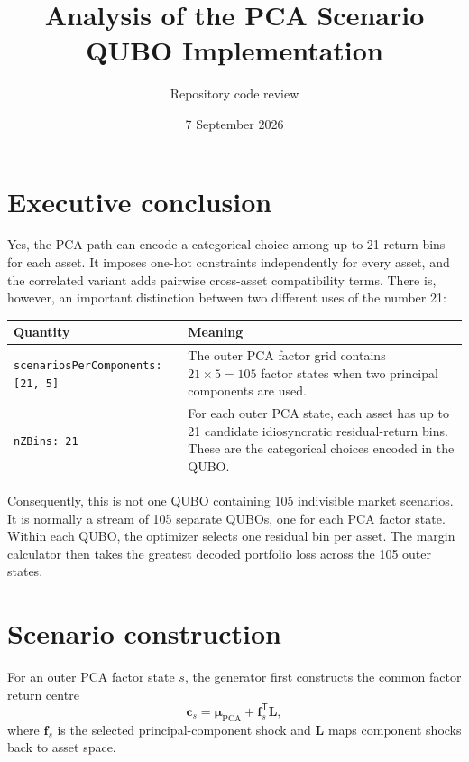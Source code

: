 \documentclass[11pt,a4paper]{article}
\title{Analysis of the PCA Scenario QUBO Implementation}
\author{Repository code review}
\date{7 September 2026}
\begin{document}
\maketitle

\section{Executive conclusion}

Yes, the PCA path can encode a categorical choice among up to 21 return bins for
each asset. It imposes one-hot constraints independently for every asset, and the
correlated variant adds pairwise cross-asset compatibility terms. There is,
however, an important distinction between two different uses of the number 21:

\begin{center}
\begin{tabular}{@{}p{}p{}@{}}
\toprule
Quantity & Meaning \\
\midrule
\texttt{scenariosPerComponents: [21, 5]}
& The outer PCA factor grid contains $21\times5=105$ factor states when two
principal components are used. \\
\texttt{nZBins: 21}
& For each outer PCA state, each asset has up to 21 candidate idiosyncratic
residual-return bins. These are the categorical choices encoded in the QUBO. \\
\bottomrule
\end{tabular}
\end{center}

Consequently, this is not one QUBO containing 105 indivisible market scenarios.
It is normally a stream of 105 separate QUBOs, one for each PCA factor state.
Within each QUBO, the optimizer selects one residual bin per asset. The margin
calculator then takes the greatest decoded portfolio loss across the 105 outer
states.

\section{Scenario construction}

For an outer PCA factor state $s$, the generator first constructs the common
factor return centre
\begin{equation}
  \mathbf{c}_s = \boldsymbol{\mu}_{\mathrm{PCA}}
  + \mathbf{f}_s^{\mathsf T}\mathbf{L},
\end{equation}
where $\mathbf{f}_s$ is the selected principal-component shock and $\mathbf{L}$
maps component shocks back to asset space.
\end{document}
